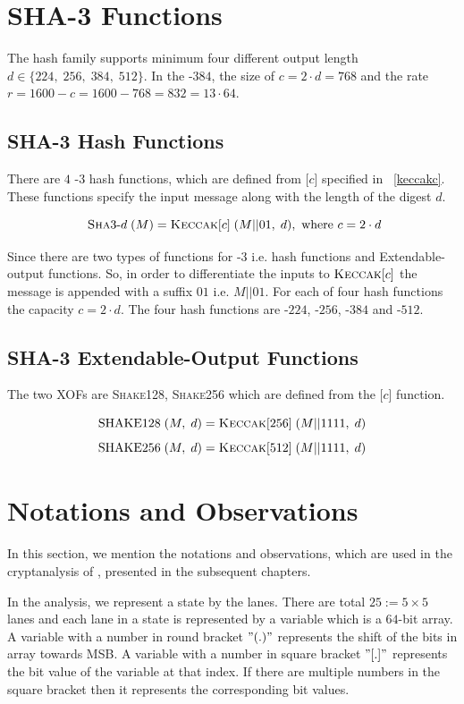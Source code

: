\section{SHA-3 Functions}

The  hash family supports minimum four different output length $d \in \{224,\;256,\;384,\;512\}$. In the \Keccak-$384$, the size of $c = 2\cdot d = 768$ and the rate $r = 1600 - c = 1600 - 768 = 832 = 13 \cdot 64$.

\subsection{SHA-3 Hash Functions}

There are $4$ \SHA-$3$ hash functions, which are defined from \KECCAK{}[$c$] specified in ~\ref{keccakc}. These functions specify the input message along with the length of the digest $d$.

\[
   \text{ \textsc{Sha}3-}d\;(M) = \mbox{\textsc{Keccak}}{}[c]\;(M||01,\; d), \text{ where } c = 2 \cdot d
\]

Since there are two types of functions for \SHA-$3$ i.e. hash functions and Extendable-output functions. So, in order to differentiate the inputs to $\mbox{\textsc{Keccak}}{}[c]$ the message is appended with a suffix $01$ i.e. $M||01$. For each of four hash functions the capacity $c = 2\cdot d$. The four hash functions are -$224$, -$256$, -$384$ and -$512$.

\subsection{SHA-3 Extendable-Output Functions}

The two  XOFs are \textsc{Shake}128, \textsc{Shake}256 which are defined from the \KECCAK{}[$c$] function.

\[
    \text{SHAKE}128\;(M,\;d) = \mbox{\textsc{Keccak}}{}[256]\;(M||1111,\; d)
\]
\[
    \text{SHAKE}256\;(M,\;d) = \mbox{\textsc{Keccak}}{}[512]\;(M||1111,\; d)
\]

\section{Notations and Observations}
In this section, we mention the notations and observations, which are used in the cryptanalysis of \KECCAK{}, presented in the subsequent chapters.

In the analysis, we represent a \KECCAK{} state by the lanes. There are 
 total $25:=5 \times 5$ lanes and each lane in a state is represented by a
 variable which is a $64$-bit array. 
A variable with a number in round bracket $"( . )"$ represents the shift of the bits in array towards MSB. A variable with a number in square bracket $"[ . ]"$ represents the bit value of the variable at that index. If there are multiple numbers in the square bracket then it represents the corresponding bit values.

